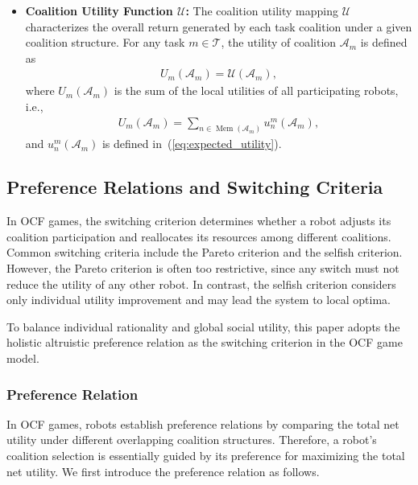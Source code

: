 \documentclass[journal,twoside,web]{ieeecolor}
\begin{document}
\begin{itemize}
\item \textbf{Coalition Utility Function $\mathcal{U}$:} The coalition utility mapping $\mathcal{U}$ characterizes the overall return generated by each task coalition under a given coalition structure. For any task $m\in\mathcal{T}$, the utility of coalition $\mathcal{A}_m$ is defined as
\begin{align}
U_m(\mathcal{A}_m)=\mathcal{U}(\mathcal{A}_m),
\end{align}
where $U_m(\mathcal{A}_m)$ is the sum of the local utilities of all participating robots, i.e.,
\begin{align}
U_m(\mathcal{A}_m)=\sum_{n\in \operatorname{Mem}(\mathcal{A}_m)} u_n^m(\mathcal{A}_m),
\end{align}
and $u_n^m(\mathcal{A}_m)$ is defined in~(\ref{eq:expected_utility}).

\end{itemize}

\subsection{Preference Relations and Switching Criteria}


In OCF games, the switching criterion determines whether a robot adjusts its coalition participation and reallocates its resources among different coalitions. Common switching criteria include the Pareto criterion and the selfish criterion. However, the Pareto criterion is often too restrictive, since any switch must not reduce the utility of any other robot. In contrast, the selfish criterion considers only individual utility improvement and may lead the system to local optima.

To balance individual rationality and global social utility, this paper adopts the holistic altruistic preference relation as the switching criterion in the OCF game model.

\subsubsection{Preference Relation}

In OCF games, robots establish preference relations by comparing the total net utility under different overlapping coalition structures. Therefore, a robot's coalition selection is essentially guided by its preference for maximizing the total net utility. We first introduce the preference relation as follows.
\end{document}
